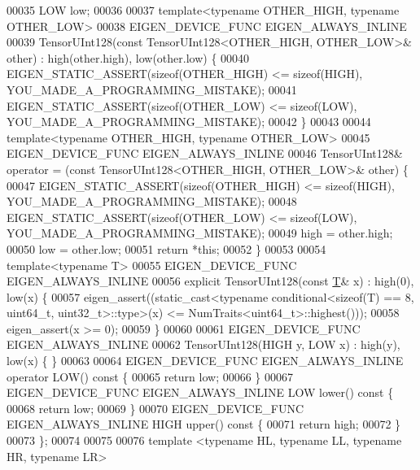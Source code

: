 \begin{DoxyCode}
00035   LOW low;
00036 
00037   \textcolor{keyword}{template}<\textcolor{keyword}{typename} OTHER\_HIGH, \textcolor{keyword}{typename} OTHER\_LOW>
00038   EIGEN\_DEVICE\_FUNC EIGEN\_ALWAYS\_INLINE
00039   TensorUInt128(\textcolor{keyword}{const} TensorUInt128<OTHER\_HIGH, OTHER\_LOW>& other) : high(other.high), low(other.low) \{
00040     EIGEN\_STATIC\_ASSERT(\textcolor{keyword}{sizeof}(OTHER\_HIGH) <= \textcolor{keyword}{sizeof}(HIGH), YOU\_MADE\_A\_PROGRAMMING\_MISTAKE);
00041     EIGEN\_STATIC\_ASSERT(\textcolor{keyword}{sizeof}(OTHER\_LOW) <= \textcolor{keyword}{sizeof}(LOW), YOU\_MADE\_A\_PROGRAMMING\_MISTAKE);
00042   \}
00043 
00044   \textcolor{keyword}{template}<\textcolor{keyword}{typename} OTHER\_HIGH, \textcolor{keyword}{typename} OTHER\_LOW>
00045   EIGEN\_DEVICE\_FUNC EIGEN\_ALWAYS\_INLINE
00046   TensorUInt128& operator = (\textcolor{keyword}{const} TensorUInt128<OTHER\_HIGH, OTHER\_LOW>& other) \{
00047     EIGEN\_STATIC\_ASSERT(\textcolor{keyword}{sizeof}(OTHER\_HIGH) <= \textcolor{keyword}{sizeof}(HIGH), YOU\_MADE\_A\_PROGRAMMING\_MISTAKE);
00048     EIGEN\_STATIC\_ASSERT(\textcolor{keyword}{sizeof}(OTHER\_LOW) <= \textcolor{keyword}{sizeof}(LOW), YOU\_MADE\_A\_PROGRAMMING\_MISTAKE);
00049     high = other.high;
00050     low = other.low;
00051     \textcolor{keywordflow}{return} *\textcolor{keyword}{this};
00052   \}
00053 
00054   \textcolor{keyword}{template}<\textcolor{keyword}{typename} T>
00055   EIGEN\_DEVICE\_FUNC EIGEN\_ALWAYS\_INLINE
00056   \textcolor{keyword}{explicit} TensorUInt128(\textcolor{keyword}{const} \hyperlink{group___sparse_core___module_class_eigen_1_1_triplet}{T}& x) : high(0), low(x) \{
00057     eigen\_assert((\textcolor{keyword}{static\_cast<}typename conditional<sizeof(T) == 8, uint64\_t, uint32\_t>::type\textcolor{keyword}{>}(x) <= 
      NumTraits<uint64\_t>::highest()));
00058     eigen\_assert(x >= 0);
00059   \}
00060 
00061   EIGEN\_DEVICE\_FUNC EIGEN\_ALWAYS\_INLINE
00062   TensorUInt128(HIGH y, LOW x) : high(y), low(x) \{ \}
00063 
00064   EIGEN\_DEVICE\_FUNC EIGEN\_ALWAYS\_INLINE \textcolor{keyword}{operator} LOW()\textcolor{keyword}{ const }\{
00065     \textcolor{keywordflow}{return} low;
00066   \}
00067   EIGEN\_DEVICE\_FUNC EIGEN\_ALWAYS\_INLINE LOW lower()\textcolor{keyword}{ const }\{
00068     \textcolor{keywordflow}{return} low;
00069   \}
00070   EIGEN\_DEVICE\_FUNC EIGEN\_ALWAYS\_INLINE HIGH upper()\textcolor{keyword}{ const }\{
00071     \textcolor{keywordflow}{return} high;
00072   \}
00073 \};
00074 
00075 
00076 \textcolor{keyword}{template} <\textcolor{keyword}{typename} HL, \textcolor{keyword}{typename} LL, \textcolor{keyword}{typename} HR, \textcolor{keyword}{typename} LR>

\end{DoxyCode}
